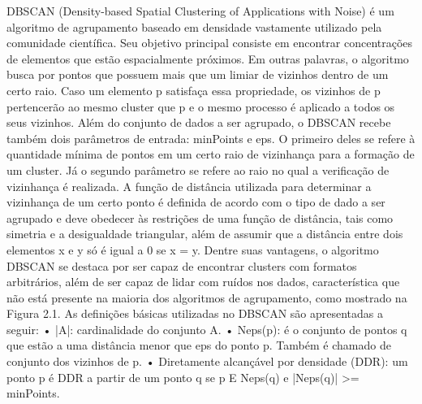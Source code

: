 DBSCAN (Density-based Spatial Clustering of Applications with Noise) é um algoritmo
de agrupamento baseado em densidade vastamente utilizado pela comunidade científica.
Seu objetivo principal consiste em encontrar concentrações de elementos que estão espacialmente
próximos. Em outras palavras, o algoritmo busca por pontos que possuem mais que um
limiar de vizinhos dentro de um certo raio. Caso um elemento p satisfaça essa propriedade, os
vizinhos de p pertencerão ao mesmo cluster que p e o mesmo processo é aplicado a todos os
seus vizinhos. Além do conjunto de dados a ser agrupado, o DBSCAN recebe também dois
parâmetros de entrada: minPoints e eps. O primeiro deles se refere à quantidade mínima de
pontos em um certo raio de vizinhança para a formação de um cluster. Já o segundo parâmetro
se refere ao raio no qual a verificação de vizinhança é realizada. A função de distância utilizada
para determinar a vizinhança de um certo ponto é definida de acordo com o tipo de dado
a ser agrupado e deve obedecer às restrições de uma função de distância, tais como simetria
e a desigualdade triangular, além de assumir que a distância entre dois elementos x e y só é
igual a 0 se x = y. Dentre suas vantagens, o algoritmo DBSCAN se destaca por ser capaz de
encontrar clusters com formatos arbitrários, além de ser capaz de lidar com ruídos nos dados,
característica que não está presente na maioria dos algoritmos de agrupamento, como mostrado
na Figura 2.1.
As definições básicas utilizadas no DBSCAN são apresentadas a seguir:
• |A|: cardinalidade do conjunto A.
• Neps(p): é o conjunto de pontos q que estão a uma distância menor que eps do ponto p.
Também é chamado de conjunto dos vizinhos de p.
• Diretamente alcançável por densidade (DDR): um ponto p é DDR a partir de um ponto q
se p E Neps(q) e |Neps(q)| >= minPoints.

